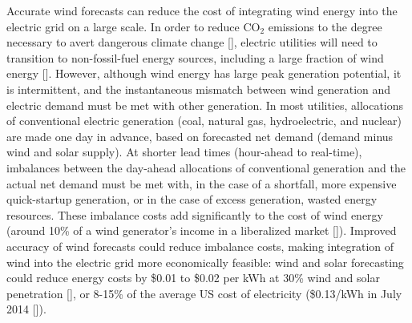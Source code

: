 Accurate wind forecasts can reduce the cost of integrating wind energy into the electric grid on a large scale.  In order to reduce CO$_2$ emissions to the degree necessary to avert dangerous climate change [\cite{stocker2013ipcc}], electric utilities will need to transition to non-fossil-fuel energy sources, including a large fraction of wind energy [\cite{jacobson2011providing}].  However, although wind energy has large peak generation potential, it is intermittent, and the instantaneous mismatch between wind generation and electric demand must be met with other generation.  In most utilities, allocations of conventional electric generation (coal, natural gas, hydroelectric, and nuclear) are made one day in advance, based on forecasted net demand (demand minus wind and solar supply).  At shorter lead times (hour-ahead to real-time), imbalances between the day-ahead allocations of conventional generation and the actual net demand must be met with, in the case of a shortfall, more expensive quick-startup generation, or in the case of excess generation, wasted energy resources.  These imbalance costs add significantly to the cost of wind energy (around 10\% of a wind generator's income in a liberalized market [\cite{fabbri2005assessment}]).  Improved accuracy of wind forecasts could reduce imbalance costs, making integration of wind into the electric grid more economically feasible: wind and solar forecasting could reduce energy costs by \$0.01 to \$0.02 per kWh at 30\% wind and solar penetration [\cite{energy2010western}], or 8-15\% of the average US cost of electricity (\$0.13/kWh in July 2014 [\cite{eia2014}]).


